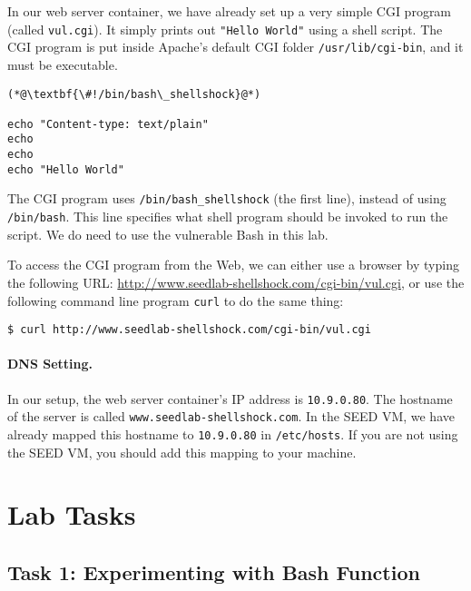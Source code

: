 In our web server container, we have already set up a very simple CGI
program (called \texttt{vul.cgi}). 
It simply prints out {\tt "Hello World"} using a shell script.
The CGI program is put inside Apache's default CGI folder \texttt{/usr/lib/cgi-bin},
and it must be executable. 

\begin{lstlisting}[caption=\texttt{vul.cgi}] 
(*@\textbf{\#!/bin/bash\_shellshock}@*)          

echo "Content-type: text/plain"
echo
echo
echo "Hello World"
\end{lstlisting}

The CGI program uses \texttt{/bin/bash\_shellshock} (the first line),
instead of using \texttt{/bin/bash}. This line specifies
what shell program should be invoked to run the script. We do need to use
the vulnerable Bash in this lab.


To access the CGI program from the Web, we can either use a browser by
typing the following URL: \url{http://www.seedlab-shellshock.com/cgi-bin/vul.cgi}, 
or use the following command line program {\tt curl} to do the same thing:

\begin{lstlisting}
$ curl http://www.seedlab-shellshock.com/cgi-bin/vul.cgi
\end{lstlisting}

\paragraph{DNS Setting.}
In our setup, the web server container's IP address is
\texttt{10.9.0.80}. The hostname of the server is called
\texttt{www.seedlab-shellshock.com}.  
In the SEED VM, we have already 
mapped this hostname to \texttt{10.9.0.80} in \texttt{/etc/hosts}. 
If you are not using the SEED VM, you should add this mapping to your machine. 


\section{Lab Tasks}


\subsection{Task 1: Experimenting with Bash Function}


